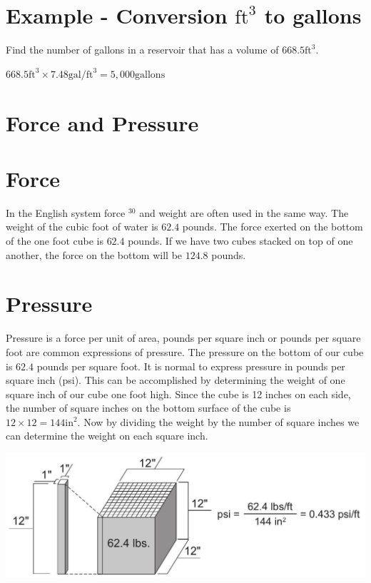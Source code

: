 \documentclass[10pt]{article}
\begin{document}
\section{Example - Conversion $\mathrm{ft}^{3}$ to gallons}
Find the number of gallons in a reservoir that has a volume of $668.5 \mathrm{ft}^{3}$.

$668.5 \mathrm{ft}^{3} \times 7.48 \mathrm{gal} / \mathrm{ft}^{3}=5,000 \mathrm{gallons}$

\section{Force and Pressure}
\section{Force}
In the English system force ${ }^{30}$ and weight are often used in the same way. The weight of the cubic foot of water is $62.4$ pounds. The force exerted on the bottom of the one foot cube is $62.4$ pounds. If we have two cubes stacked on top of one another, the force on the bottom will be $124.8$ pounds.

\section{Pressure}
Pressure is a force per unit of area, pounds per square inch or pounds per square foot are common expressions of pressure. The pressure on the bottom of our cube is $62.4$ pounds per square foot. It is normal to express pressure in pounds per square inch (psi). This can be accomplished by determining the weight of one square inch of our cube one foot high. Since the cube is 12 inches on each side, the number of square inches on the bottom surface of the cube is $12 \times 12=144 \mathrm{in}^{2}$. Now by dividing the weight by the number of square inches we can determine the weight on each square inch.

\includegraphics[max width=\textwidth]{2022_11_03_65aa625ded296bdfd01fg-16}
\end{document}
